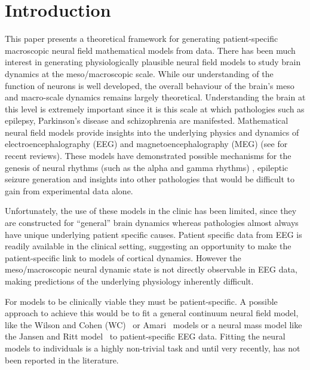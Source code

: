 \documentclass[twocolumn,11pt,a4paper]{article}		%
\begin{document}
\maketitle

\section{Introduction} This paper presents a theoretical framework for generating patient-specific macroscopic neural field mathematical models from data. There has been much interest in generating physiologically plausible neural field models to study brain dynamics at the meso/macroscopic scale. While our understanding of the function of neurons is well developed, the overall behaviour of the brain's meso and macro-scale dynamics remains largely theoretical. Understanding the brain at this level is extremely important since it is this scale at which pathologies such as epilepsy, Parkinson's disease and schizophrenia are manifested. Mathematical neural field models provide insights into the underlying physics and dynamics of electroencephalography (EEG) and magnetoencephalography (MEG) (see \cite{Deco2008,David2003} for recent reviews). These models have demonstrated possible mechanisms for the genesis of neural rhythms (such as the alpha and gamma rhythms) \cite{Liley1999,RENNIE2000}, epileptic seizure generation \cite{DaSilva2003,Suffczynski2004,Wendling2005} and insights into other pathologies \cite{Moran2008,Schiff2009} that would be difficult to gain from experimental data alone. 

Unfortunately, the use of these models in the clinic has been limited, since they are constructed for ``general'' brain dynamics whereas pathologies almost always have unique underlying patient specific causes. Patient specific data from EEG is readily available in the clinical setting, suggesting an opportunity to make the patient-specific link to models of cortical dynamics. However the meso/macroscopic neural dynamic state is not directly observable in EEG data, making predictions of the underlying physiology inherently difficult.

For models to be clinically viable they must be patient-specific. A possible approach to achieve this would be to fit a general continuum neural field model, like the Wilson and Cohen (WC)~\cite{Wilson1973} or Amari~\cite{Amari1977} models or a neural mass model like the Jansen and Ritt model~\cite{Jansen1995} to patient-specific EEG data. Fitting the neural models to individuals is a highly non-trivial task and until very recently, has not been reported in the literature. 
\end{document}
